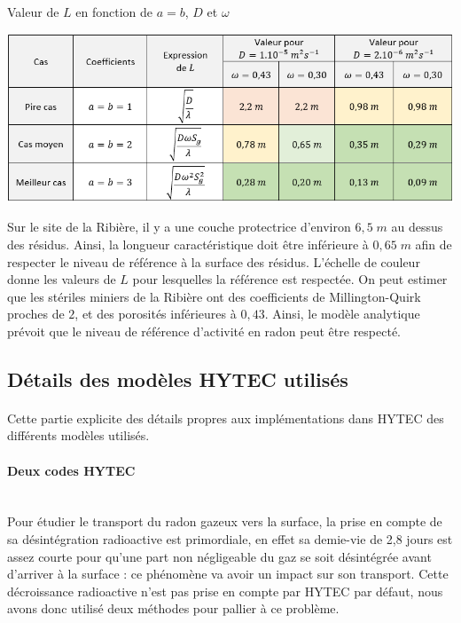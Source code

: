 \documentclass{article}
\begin{document}
\begin{table}[H]
    \centering
    \caption{Valeur de $L$ en fonction de $a=b$, $D$ et $\omega$}
    \includegraphics[width = \linewidth]{III_C_9.png}

    \label{tab:sens_mq_poro}
\end{table}

Sur le site de la Ribière, il y a une couche protectrice d'environ $6,5\;m$ au dessus des résidus. Ainsi, la longueur caractéristique doit être inférieure à $0,65\;m$ afin de respecter le niveau de référence à la surface des résidus. L'échelle de couleur donne les valeurs de $L$ pour lesquelles la référence est respectée. On peut estimer que les stériles miniers de la Ribière ont des coefficients de Millington-Quirk proches de $2$, et des porosités inférieures à $0,43$. Ainsi, le modèle analytique prévoit que le niveau de référence d'activité en radon peut être respecté.

\subsection{Détails des modèles HYTEC utilisés}
\label{annexe:detail_modele_radon_sub_sec}
\paragraph{}Cette partie explicite des détails propres aux implémentations dans HYTEC des différents modèles utilisés.

\paragraph{Deux codes HYTEC \\ \\}
Pour étudier le transport du radon gazeux vers la surface, la prise en compte de sa désintégration radioactive est primordiale, en effet sa demie-vie de 2,8 jours est assez courte pour qu'une part non négligeable du gaz se soit désintégrée  avant d'arriver à la surface : ce phénomène va avoir un impact sur son transport. Cette décroissance radioactive n'est pas prise en compte par HYTEC par défaut, nous avons donc utilisé deux méthodes pour pallier à ce problème.
\end{document}
